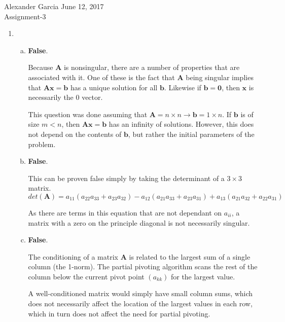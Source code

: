 \documentclass[11pt]{article}
\begin{document}
\lstset{stringstyle=\ttfamily,
	showstringspaces=false,
	basicstyle=\small}

\begin{center} Alexander Garcia \hfill June 12, 2017 \\ Assignment-3 \end{center}

\medskip

\begin{enumerate}

	\item
	\begin{enumerate}[(a)]

		\item \textbf{False}.

		Because $\mathbf{A}$ is nonsingular, there are a number of properties that are associated with it. One of these is the fact that $\mathbf{A}$ being
		singular implies that $\mathbf{Ax = b}$ has a unique solution for all $\mathbf{b}$. Likewise if $\mathbf{b = 0}$, then $\mathbf{x}$ is necessarily the 0
		vector.

		This question was done assuming that $\mathbf{A}=n\times n \rightarrow \mathbf{b}=1\times n$. If $\mathbf{b}$ is of size $m<n$, then $\mathbf{Ax=b}$ has
		an infinity of solutions. However, this does not depend on the contents of $\mathbf{b}$, but rather the initial parameters of the problem. \\

		\item \textbf{False}.

		This can be proven false simply by taking the determinant of a $3\times 3$ matrix.
		$$det(\mathbf{A}) = a_{11}(a_{22}a_{33} + a_{23}a_{32}) - a_{12}(a_{21}a_{33} + a_{23}a_{31}) + a_{13}(a_{21}a_{32} + a_{22}a_{31})$$

		As there are terms in this equation that are not dependant on $a_{ii}$, a matrix with a zero on the principle diagonal is not necessarily singular.\\

		\item \textbf{False}.

		The conditioning of a matrix $\mathbf{A}$ is related to the largest sum of a single column (the 1-norm). The partial pivoting algorithm scans the rest of the
		column below the current pivot point $(a_{kk})$ for the largest value.

		A well-conditioned matrix would simply have small column sums, which does not necessarily affect the location of the largest values in each row, which in turn
		does not affect the need for partial pivoting. \\


\end{enumerate}
\end{enumerate}
\end{document}
